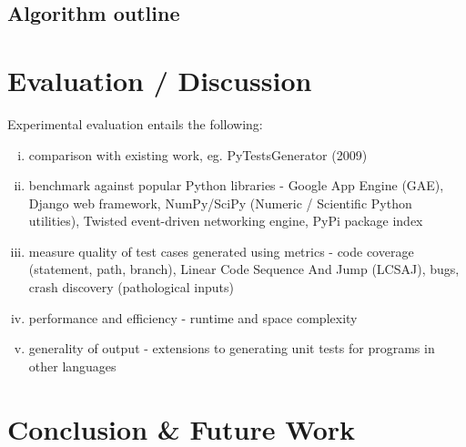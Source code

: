 \documentclass{icldt}
\numberwithin{equation}{section}       %
\begin{document}
\section{Algorithm outline}
\chapter{Evaluation / Discussion}
\begin{comment}
\begin{itemize}
	\item How to measure success?
	\item Which aspects (qualitative eg. ease of use/quantitative), and how to measure?
	\item What functionality to demonstrate?
	\item What experiments to undertake, and what outcome constitutes success?
	\item Which tests/benchmarks, and results?
	\item Comparison with existing work?
	\item Contribution to extending state of the art?
\end{itemize}
\end{comment}

Experimental evaluation entails the following:
\begin{enumerate}[i.]
	\item comparison with existing work, eg. PyTestsGenerator (2009)
	\item benchmark against popular Python libraries - Google App Engine (GAE), Django web framework, NumPy/SciPy (Numeric / Scientific Python utilities), Twisted event-driven networking engine, PyPi package index
	\item measure quality of test cases generated using metrics - code coverage (statement, path, branch), Linear Code Sequence And Jump (LCSAJ), bugs, crash discovery (pathological inputs)
	\item performance and efficiency - runtime and space complexity
	\item generality of output - extensions to generating unit tests for programs in other languages
\end{enumerate}
\chapter{Conclusion \& Future Work}
\end{document}
